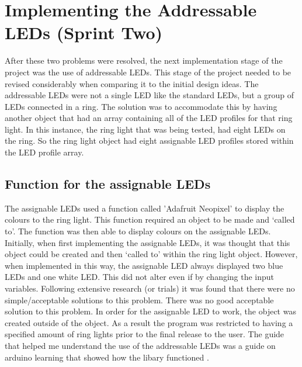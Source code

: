 \section {Implementing the Addressable LEDs (Sprint Two)}
After these two problems were resolved, the next implementation stage of the project was the use of addressable LEDs. This stage of the project needed to be revised considerably when comparing it to the initial design ideas. The addressable LEDs were not a single LED like the standard LEDs, but a group of LEDs connected in a ring. The solution was to accommodate this by having another object that had an array containing all of the LED profiles for that ring light. In this instance, the ring light that was being tested, had eight LEDs on the ring. So the ring light object had eight assignable LED profiles stored within the LED profile array.

\subsection{Function for the assignable LEDs}
The assignable LEDs used a function called 'Adafruit Neopixel' to display the colours to the ring light. This function required an object to be made and ‘called to’. The function was then able to display colours on the assignable LEDs. Initially, when first implementing the assignable LEDs, it was thought that this object could be created and then ‘called to’ within the ring light object. However, when implemented in this way, the assignable LED always displayed two blue LEDs and one white LED.  This did not alter even if by changing the input variables.  Following extensive research (or trials) it was found that there were no simple/acceptable solutions to this problem.  There was no good acceptable solution to this problem. In order for the assignable LED to work, the object was created outside of the object. As a result the program was restricted to having a specified amount of ring lights prior to the final release to the user. The guide that helped me understand the use of the addressable LEDs was a guide on arduino learning that showed how the libary functioned \cite{WS2812}.

